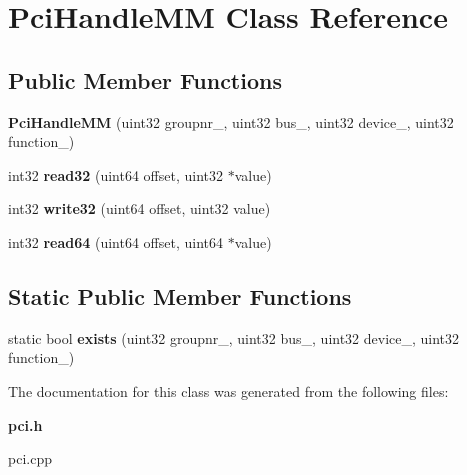 \section{Pci\+Handle\+MM Class Reference}
\label{classPciHandleMM}
\subsection*{Public Member Functions}
\begin{DoxyCompactItemize}
\item 
\mbox{\label{classPciHandleMM_ad228ca4f3665b17592fdf43229c8a776}} 
{\bfseries Pci\+Handle\+MM} (uint32 groupnr\+\_\+, uint32 bus\+\_\+, uint32 device\+\_\+, uint32 function\+\_\+)
\item 
\mbox{\label{classPciHandleMM_a75b8adf35f6ef1bda3228cf78d07e4d7}} 
int32 {\bfseries read32} (uint64 offset, uint32 $\ast$value)
\item 
\mbox{\label{classPciHandleMM_af57465df47969e4ca08b40cb964b5ef5}} 
int32 {\bfseries write32} (uint64 offset, uint32 value)
\item 
\mbox{\label{classPciHandleMM_a1d9e24e51c83e17aeffd6eb4f1e8ff2c}} 
int32 {\bfseries read64} (uint64 offset, uint64 $\ast$value)
\end{DoxyCompactItemize}
\subsection*{Static Public Member Functions}
\begin{DoxyCompactItemize}
\item 
\mbox{\label{classPciHandleMM_a52ff1efa7fddeeca3f76e2a7b2b328c0}} 
static bool {\bfseries exists} (uint32 groupnr\+\_\+, uint32 bus\+\_\+, uint32 device\+\_\+, uint32 function\+\_\+)
\end{DoxyCompactItemize}


The documentation for this class was generated from the following files\+:\begin{DoxyCompactItemize}
\item 
\textbf{ pci.\+h}\item 
pci.\+cpp\end{DoxyCompactItemize}
